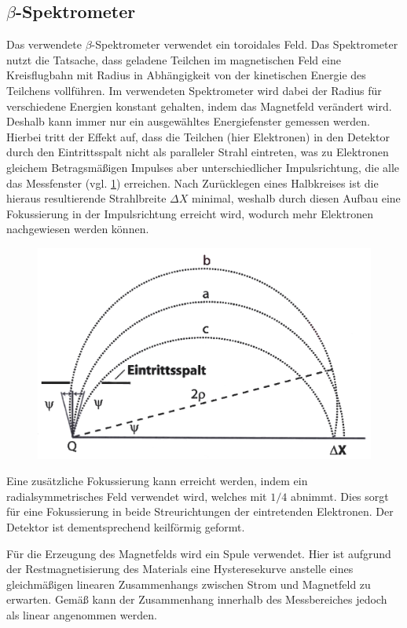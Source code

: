 \documentclass[
	a4paper,
	12pt,
	pagesize,
	ngerman
]{scrartcl}
\begin{document}
	\subsection{$\beta$-Spektrometer}
	Das verwendete $\beta$-Spektrometer verwendet ein toroidales Feld.
	Das Spektrometer nutzt die Tatsache, dass geladene Teilchen im magnetischen Feld eine Kreisflugbahn mit Radius in Abhängigkeit von der kinetischen Energie des Teilchens vollführen.
	Im verwendeten Spektrometer wird dabei der Radius für verschiedene Energien konstant gehalten, indem das Magnetfeld verändert wird.
	Deshalb kann immer nur ein ausgewähltes Energiefenster gemessen werden.
	Hierbei tritt der Effekt auf, dass die Teilchen (hier Elektronen) in den Detektor durch den Eintrittsspalt nicht als paralleler Strahl eintreten, was zu Elektronen gleichem Betragsmäßigen Impulses aber unterschiedlicher Impulsrichtung, die alle das Messfenster (vgl. \cref{fig_Halbkreisspektrometer}) erreichen.
	Nach Zurücklegen eines Halbkreises ist die hieraus resultierende Strahlbreite $\Delta X$ minimal, weshalb durch diesen Aufbau eine Fokussierung in der Impulsrichtung erreicht wird, wodurch mehr Elektronen nachgewiesen werden können.

	\begin{figure}[H]
			\includegraphics[width= 0.6 \linewidth]{img/spektrometer_schema}
			\caption{
			\cite{Anleitung}
			}
			\label{fig_Halbkreisspektrometer}
	\end{figure}

	Eine zusätzliche Fokussierung kann erreicht werden, indem ein radialsymmetrisches Feld verwendet wird, welches mit $1/4$ abnimmt.
	Dies sorgt für eine Fokussierung in beide Streurichtungen der eintretenden Elektronen.
	Der Detektor ist dementsprechend keilförmig geformt. %

	Für die Erzeugung des Magnetfelds wird ein Spule verwendet.
	Hier ist aufgrund der Restmagnetisierung des Materials eine Hysteresekurve anstelle eines gleichmäßigen linearen Zusammenhangs zwischen Strom und Magnetfeld zu erwarten.
	Gemäß \cite{Anleitung} kann der Zusammenhang innerhalb des Messbereiches jedoch als linear angenommen werden.
\end{document}
